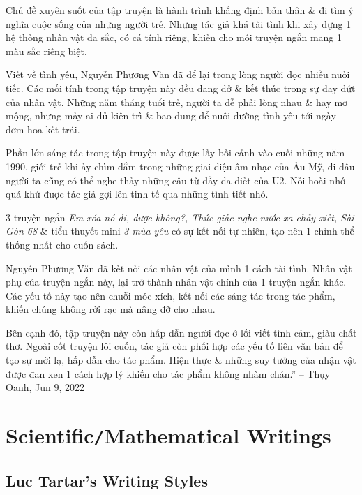 \documentclass[oneside]{book}
\numberwithin{equation}{section}
\begin{document}
Chủ đề xuyên suốt của tập truyện là hành trình khẳng định bản thân \& đi tìm ý nghĩa cuộc sống của những người trẻ. Nhưng tác giả khá tài tình khi xây dựng 1 hệ thống nhân vật đa sắc, có cá tính riêng, khiến cho mỗi truyện ngắn mang 1 màu sắc riêng biệt.

Viết về tình yêu, Nguyễn Phương Văn đã để lại trong lòng người đọc nhiều nuối tiếc. Các mối tính trong tập truyện này đều dang dở \& kết thúc trong sự day dứt của nhân vật. Những năm tháng tuổi trẻ, người ta dễ phải lòng nhau \& hay mơ mộng, nhưng mấy ai đủ kiên trì \& bao dung để nuôi dưỡng tình yêu tới ngày đơm hoa kết trái.

Phần lớn sáng tác trong tập truyện này được lấy bối cảnh vào cuối những năm 1990, giới trẻ khi ấy chìm đắm trong những giai điệu âm nhạc của Âu Mỹ, đi đâu người ta cũng có thể nghe thấy những câu từ đầy da diết của U2. Nỗi hoài nhớ quá khứ được tác giả gợi lên tinh tế qua những tình tiết nhỏ.

3 truyện ngắn \textit{Em xóa nó đi, được không?, Thức giấc nghe nước xa chảy xiết, Sài Gòn 68} \& tiểu thuyết mini \textit{3 mùa yêu} có sự kết nối tự nhiên, tạo nên 1 chỉnh thể thống nhất cho cuốn sách.

Nguyễn Phương Văn đã kết nối các nhân vật của mình 1 cách tài tình. Nhân vật phụ của truyện ngắn này, lại trở thành nhân vật chính của 1 truyện ngắn khác. Các yếu tố này tạo nên chuỗi móc xích, kết nối các sáng tác trong tác phẩm, khiến chúng không rời rạc mà nâng đỡ cho nhau.

Bên cạnh đó, tập truyện này còn hấp dẫn người đọc ở lối viết tình cảm, giàu chất thơ. Ngoài cốt truyện lôi cuốn, tác giả còn phối hợp các yếu tố liên văn bản để tạo sự mới lạ, hấp dẫn cho tác phẩm. Hiện thực \& những suy tưởng của nhận vật được đan xen 1 cách hợp lý khiến cho tác phẩm không nhàm chán.'' -- Thụy Oanh, Jun 9, 2022


\part{Scientific\texttt{/}Mathematical Writings}

\chapter{Luc Tartar's Writing Styles}

\end{document}
